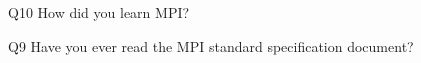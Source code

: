 \begin{description}%
\item{Q10} How did you learn MPI?%
\item{Q9} Have you ever read the MPI standard specification document?%
\end{description}%
